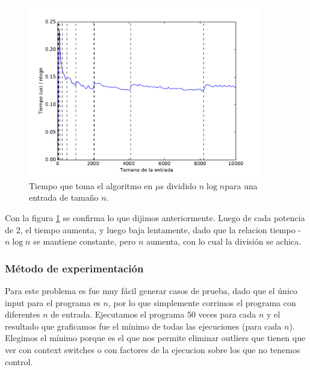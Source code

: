 \begin{figure}[H]
 \centering
	\includegraphics[width=0.9\textwidth]{img/tiempos/kaioken2.pdf}
	\caption{\footnotesize Tiempo que toma el algoritmo en $\mu$s dividido $n\log n$para una entrada de tamaño $n$.}
	\label{fig:kaioken-tiempos2}
\end{figure}

Con la figura \ref{fig:kaioken-tiempos2} se confirma lo que dijimos anteriormente. Luego de cada potencia de 2, el tiempo aumenta, y luego baja lentamente, dado que la relacion tiempo - $n \log n$ se mantiene constante, pero $n$ aumenta, con lo cual la división se achica.


\subsubsection{M\'etodo de experimentación}

Para este problema es fue muy fácil generar casos de prueba, dado que el único input para el programa es $n$, por lo que simplemente corrimos el programa con diferentes $n$ de entrada. Ejecutamos el programa 50 veces para cada $n$ y el resultado que graficamos fue el mínimo de todas las ejecuciones (para cada $n$). Elegimos el mínimo porque es el que nos permite eliminar outliers que tienen que ver con context switches o con factores de la ejecucion sobre los que no tenemos control.


